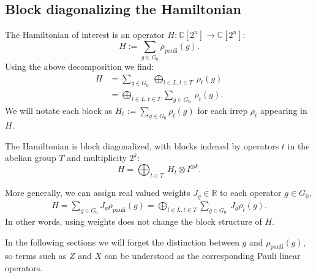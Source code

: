 \documentclass[a4paper,onecolumn,11pt,unpublished]{quantumarticle}
\def\Complex{\mathbb{C}}
\def\R{\mathbb{R}}
\def\Ham{H}
\renewenvironment{framed}
{\begin{samepage}
\MakeFramed{\hsize0.8\linewidth\advance\hsize-\width\FrameRestore}}
{\endMakeFramed\end{samepage}}
\begin{document}
\subsection{Block diagonalizing the Hamiltonian}\label{Sec35}

The Hamiltonian of interest is 
an operator $\Ham:\Complex[2^n]\to\Complex[2^n]$:
$$ \Ham := \sum_{g\in G_0} \rho_{\mathrm{pauli}}(g).$$
Using the above decomposition we find:
\begin{align*}
    \Ham &= \sum_{g\in G_0}\ \bigoplus_{l\in L, t\in T}\ \rho_t(g)\\
         &= \bigoplus_{l\in L, t\in T} \sum_{g\in G_0}\ \rho_t(g).
\end{align*}
We will notate each block as
$\Ham_t := \sum_{g\in G_0}\rho_t(g)$
for each irrep $\rho_t$ appearing in $\Ham.$
\begin{framed}
\noindent
The Hamiltonian is block diagonalized, with blocks indexed by operators $t$ in
the abelian group $T$ and multiplicity $2^k:$
$$
    \Ham =  \bigoplus_{t\in T}\ \Ham_t \otimes I^{\otimes k}.
$$
\end{framed}

More generally, we can assign real valued weights
$J_g\in\R$
to each operator $g\in G_0,$
\begin{align*}
    \Ham = \sum_{g\in G_0} J_g \rho_{\mathrm{pauli}}(g)
            = \bigoplus_{l\in L, t\in T} \sum_{g\in G_0}\ J_g \rho_t(g).
\end{align*}
In other words, using weights does not change the block structure of $\Ham.$

In the following sections we will forget the distinction 
between $g$ and $\rho_{\mathrm{pauli}}(g)$,
so terms such as $Z$ and $X$ can be understood
as the corresponding Pauli linear operators.

%
%
\end{document}
